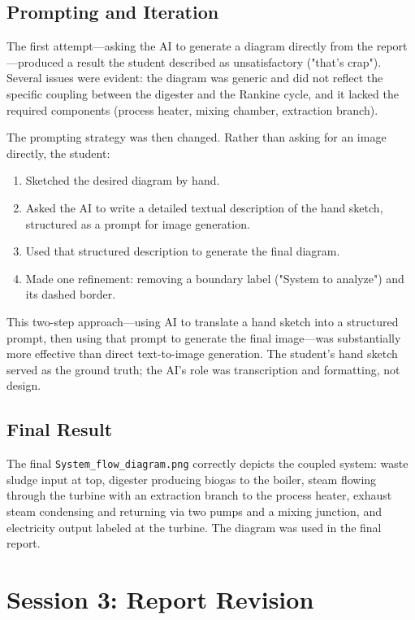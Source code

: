 \documentclass[12pt, letterpaper]{article}
\begin{document}
\subsection{Prompting and Iteration}

The first attempt---asking the AI to generate a diagram directly from the report---produced a result the student described as unsatisfactory ("that's crap"). Several issues were evident: the diagram was generic and did not reflect the specific coupling between the digester and the Rankine cycle, and it lacked the required components (process heater, mixing chamber, extraction branch).

The prompting strategy was then changed. Rather than asking for an image directly, the student:

\begin{enumerate}[noitemsep]
    \item Sketched the desired diagram by hand.
    \item Asked the AI to write a detailed textual description of the hand sketch, structured as a prompt for image generation.
    \item Used that structured description to generate the final diagram.
    \item Made one refinement: removing a boundary label ("System to analyze") and its dashed border.
\end{enumerate}

This two-step approach---using AI to translate a hand sketch into a structured prompt, then using that prompt to generate the final image---was substantially more effective than direct text-to-image generation. The student's hand sketch served as the ground truth; the AI's role was transcription and formatting, not design.

\subsection{Final Result}

The final \texttt{System\_flow\_diagram.png} correctly depicts the coupled system: waste sludge input at top, digester producing biogas to the boiler, steam flowing through the turbine with an extraction branch to the process heater, exhaust steam condensing and returning via two pumps and a mixing junction, and electricity output labeled at the turbine. The diagram was used in the final report.

\section{Session 3: Report Revision}
\end{document}
